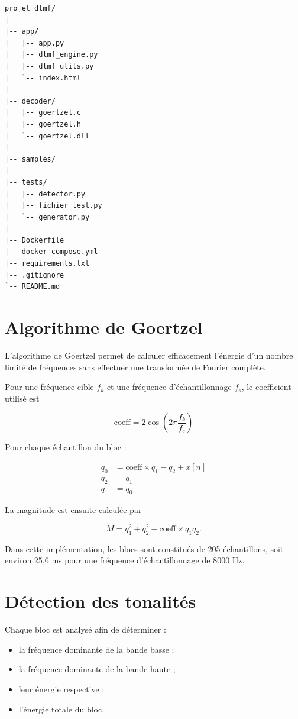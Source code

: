 \documentclass[12pt,a4paper]{article}
\begin{document}
\bigskip

\begin{verbatim}
projet_dtmf/
|
|-- app/
|   |-- app.py
|   |-- dtmf_engine.py
|   |-- dtmf_utils.py
|   `-- index.html
|
|-- decoder/
|   |-- goertzel.c
|   |-- goertzel.h
|   `-- goertzel.dll
|
|-- samples/
|
|-- tests/
|   |-- detector.py
|   |-- fichier_test.py
|   `-- generator.py
|
|-- Dockerfile
|-- docker-compose.yml
|-- requirements.txt
|-- .gitignore
`-- README.md
\end{verbatim}

\section{Algorithme de Goertzel}

L'algorithme de Goertzel permet de calculer efficacement l'énergie d'un nombre limité de fréquences sans effectuer une transformée de Fourier complète.

Pour une fréquence cible $f_k$ et une fréquence d'échantillonnage $f_s$, le coefficient utilisé est

\[
\mathrm{coeff}=2\cos\left(2\pi\frac{f_k}{f_s}\right)
\]

Pour chaque échantillon du bloc :

\[
\begin{aligned}
q_0 &= \mathrm{coeff}\times q_1-q_2+x[n] \\
q_2 &= q_1 \\
q_1 &= q_0
\end{aligned}
\]

La magnitude est ensuite calculée par

\[
M=q_1^2+q_2^2-\mathrm{coeff}\times q_1q_2.
\]

Dans cette implémentation, les blocs sont constitués de 205 échantillons, soit environ 25,6 ms pour une fréquence d'échantillonnage de 8000 Hz.

\section{Détection des tonalités}

Chaque bloc est analysé afin de déterminer :

\begin{itemize}

\item la fréquence dominante de la bande basse ;

\item la fréquence dominante de la bande haute ;

\item leur énergie respective ;

\item l'énergie totale du bloc.

\end{itemize}
\end{document}
